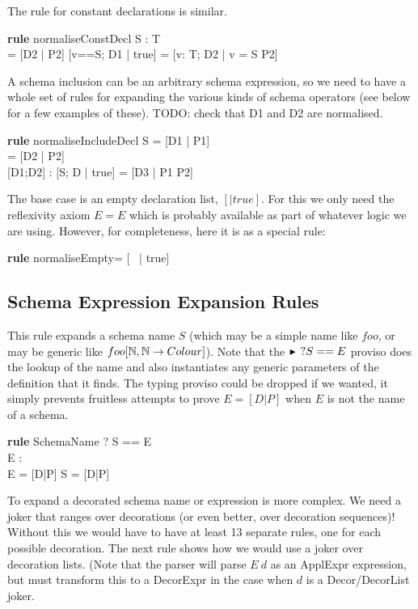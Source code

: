 \documentclass{article}
\newenvironment{zedrule}[1]{\par\textbf{rule }#1\vspace{-2ex}\infrule}{\endinfrule}
\newcommand{\derives}{\derive{}}
\newcommand{\proviso}{\raisebox{0.5ex}{${}_{\blacktriangleright}\ $}}%
\begin{document}
The rule for constant declarations is similar.
\begin{zedrule}{normaliseConstDecl}
   \proviso S : T \\
   [D1 | true] = [D2 | P2]
\derives
   [v==S; D1 | true] = [v: T; D2 | v = S \land P2]
\end{zedrule}

A schema inclusion can be an arbitrary schema expression,
so we need to have a whole set of rules for expanding
the various kinds of schema operators (see below for a 
few examples of these).  TODO: check that D1 and D2 are
normalised.
\begin{zedrule}{normaliseIncludeDecl}
   S = [D1 | P1] \\
   [D | true] = [D2 | P2] \\
   \proviso [D1;D2] : \power [D3]
\derives
   [S; D | true] = [D3 | P1 \land P2]
\end{zedrule}

The base case is an empty declaration list, $[|true]$.
For this we only need the reflexivity axiom $E=E$ which
is probably available as part of whatever logic we are
using.  However, for completeness, here it is as a special rule:
\begin{zedrule}{normaliseEmpty}
   [~ | true] = [~ | true]
\end{zedrule}


\subsection{Schema Expression Expansion Rules}

This rule expands a schema name $S$ (which may be
a simple name like $foo$, or may be generic like 
$foo[\nat,\nat \fun Colour]$).  Note that the
$\proviso? S==E$ proviso does the lookup of the
name and also instantiates any generic parameters
of the definition that it finds.  The typing proviso
could be dropped if we wanted, it simply prevents
fruitless attempts to prove $E=[D|P]$ when $E$
is not the name of a schema.
\begin{zedrule}{SchemaName}
  \proviso? S == E \\
  \proviso E : \power [\_] \\
  E = [D|P]
\derives
  S = [D|P]
\end{zedrule}


To expand a decorated schema name or expression is more complex.
We need a joker that ranges over decorations 
(or even better, over decoration sequences)!
Without this we would have to have at least 13 separate rules,
one for each possible decoration.  The next rule shows
how we would use a joker over decoration lists.
(Note that the parser will parse $E~d$ as an ApplExpr
expression, but must transform this to a DecorExpr in the
case when $d$ is a Decor/DecorList joker.
\end{document}
